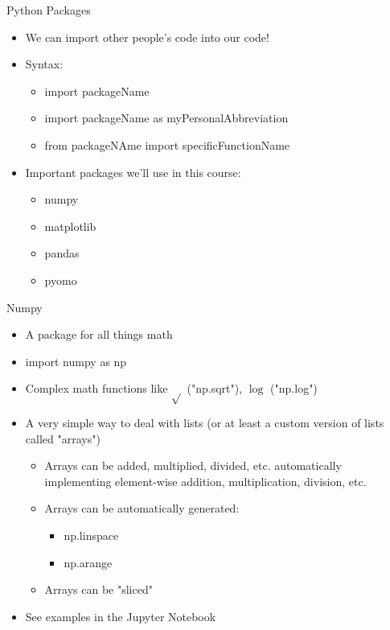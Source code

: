 \documentclass[10pt, aspectratio=169]{beamer}
\begin{document}
\begin{frame}{Python Packages}
    \begin{itemize}
        \item We can import other people's code into our code!
        \item Syntax:
        \begin{itemize}
            \item import packageName
            \item import packageName as myPersonalAbbreviation
            \item from packageNAme import specificFunctionName
        \end{itemize}
        \item Important packages we'll use in this course:
        \begin{itemize}
            \item numpy
            \item matplotlib
            \item pandas
            \item pyomo
        \end{itemize}
    \end{itemize}
\end{frame}

\begin{frame}{Numpy}
    \begin{itemize}
        \item A package for all things math 
        \item import numpy as np
        \item Complex math functions like $\sqrt{}$ ("np.sqrt"), $\log{}$ ("np.log")
        \item A very simple way to deal with lists (or at least a custom version of lists called "arrays")
        \begin{itemize}
            \item Arrays can be added, multiplied, divided, etc. automatically implementing element-wise addition, multiplication, division, etc.
            \item Arrays can be automatically generated:
            \begin{itemize}
                \item np.linspace
                \item np.arange
            \end{itemize}
            \item Arrays can be "sliced"
        \end{itemize}
        \item See examples in the Jupyter Notebook
    \end{itemize}
\end{frame}
\end{document}
